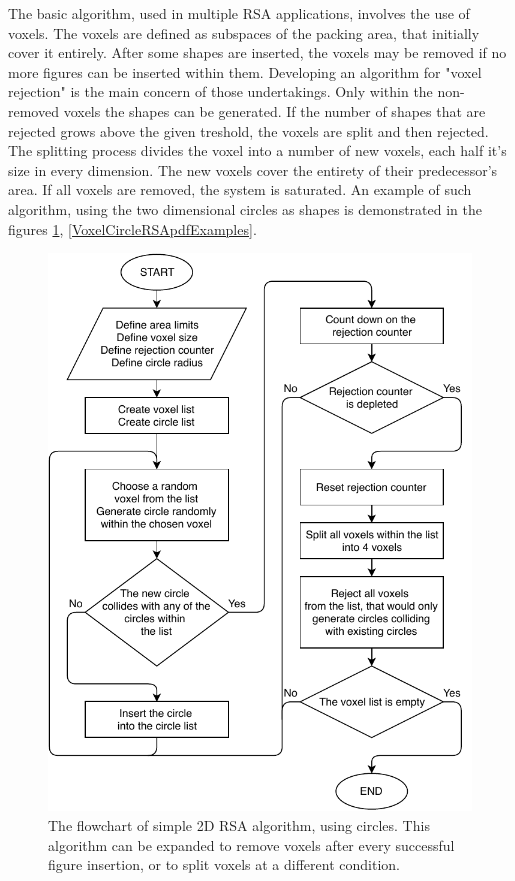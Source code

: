 \documentclass[12pt, oneside]{report}
\begin{document}
The basic algorithm, used in multiple RSA applications, involves the use of voxels. The voxels are defined as subspaces of the packing area, that initially cover it entirely. After some shapes are inserted, the voxels may be removed if no more figures can be inserted within them. Developing an algorithm for "voxel rejection" is the main concern of those undertakings. Only within the non-removed voxels the shapes can be generated. If the number of shapes that are rejected grows above the given treshold, the voxels are split and then rejected. The splitting process divides the voxel into a number of new voxels, each half it's size in every dimension. The new voxels cover the entirety of their predecessor's area. If all voxels are removed, the system is saturated. An example of such algorithm, using the two dimensional circles as shapes is demonstrated in the figures \ref{VoxelCircleRSApdff}, \ref{VoxelCircleRSApdfExamples}.

\begin{figure}[H]

  \centering
	\includegraphics{Images/2dCircleRSA/VoxelCircleRSA.pdf}
  \caption{The flowchart of simple 2D RSA algorithm, using circles. \newline
		This algorithm can be expanded to remove voxels after every successful figure insertion, or to split voxels at a different condition.}

	\label{VoxelCircleRSApdff}
\end{figure}
\end{document}
